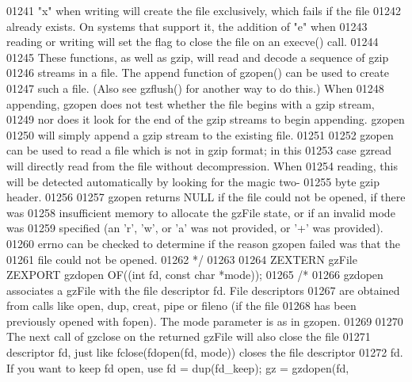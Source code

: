\begin{DoxyCode}
01241 \textcolor{comment}{   "x" when writing will create the file exclusively, which fails if the file}
01242 \textcolor{comment}{   already exists.  On systems that support it, the addition of "e" when}
01243 \textcolor{comment}{   reading or writing will set the flag to close the file on an execve() call.}
01244 \textcolor{comment}{}
01245 \textcolor{comment}{     These functions, as well as gzip, will read and decode a sequence of gzip}
01246 \textcolor{comment}{   streams in a file.  The append function of gzopen() can be used to create}
01247 \textcolor{comment}{   such a file.  (Also see gzflush() for another way to do this.)  When}
01248 \textcolor{comment}{   appending, gzopen does not test whether the file begins with a gzip stream,}
01249 \textcolor{comment}{   nor does it look for the end of the gzip streams to begin appending.  gzopen}
01250 \textcolor{comment}{   will simply append a gzip stream to the existing file.}
01251 \textcolor{comment}{}
01252 \textcolor{comment}{     gzopen can be used to read a file which is not in gzip format; in this}
01253 \textcolor{comment}{   case gzread will directly read from the file without decompression.  When}
01254 \textcolor{comment}{   reading, this will be detected automatically by looking for the magic two-}
01255 \textcolor{comment}{   byte gzip header.}
01256 \textcolor{comment}{}
01257 \textcolor{comment}{     gzopen returns NULL if the file could not be opened, if there was}
01258 \textcolor{comment}{   insufficient memory to allocate the gzFile state, or if an invalid mode was}
01259 \textcolor{comment}{   specified (an 'r', 'w', or 'a' was not provided, or '+' was provided).}
01260 \textcolor{comment}{   errno can be checked to determine if the reason gzopen failed was that the}
01261 \textcolor{comment}{   file could not be opened.}
01262 \textcolor{comment}{*/}
01263 
01264 ZEXTERN gzFile ZEXPORT gzdopen OF((\textcolor{keywordtype}{int} fd, \textcolor{keyword}{const} \textcolor{keywordtype}{char} *mode));
01265 \textcolor{comment}{/*}
01266 \textcolor{comment}{     gzdopen associates a gzFile with the file descriptor fd.  File descriptors}
01267 \textcolor{comment}{   are obtained from calls like open, dup, creat, pipe or fileno (if the file}
01268 \textcolor{comment}{   has been previously opened with fopen).  The mode parameter is as in gzopen.}
01269 \textcolor{comment}{}
01270 \textcolor{comment}{     The next call of gzclose on the returned gzFile will also close the file}
01271 \textcolor{comment}{   descriptor fd, just like fclose(fdopen(fd, mode)) closes the file descriptor}
01272 \textcolor{comment}{   fd.  If you want to keep fd open, use fd = dup(fd\_keep); gz = gzdopen(fd,}

\end{DoxyCode}
